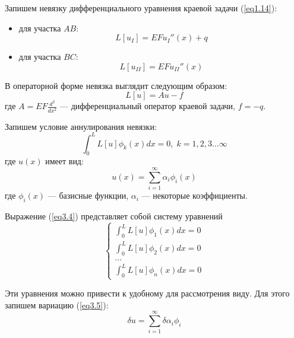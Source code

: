 Запишем невязку дифференциального уравнения краевой задачи (\ref{eq1.14}):
\begin{itemize}
    \item для участка $AB$:
    \begin{equation}
        \label{eq3.1}
        L[u_I] = EFu_I''(x) + q
    \end{equation}
    \item для участка $BC$:
    \begin{equation}
        \label{eq3.2}
        L[u_{II}] = EFu_{II}''(x)
    \end{equation}
\end{itemize}

В операторной форме невязка выглядит следующим образом:
\begin{equation}
    \label{eq3.3}
    L[u] = Au - f
\end{equation}
где $\displaystyle A = EF\frac{d^2}{dx^2}$ --- дифференциальный оператор краевой задачи, $f = -q$.

Запишем условие аннулирования невязки:
\begin{equation}
    \label{eq3.4}
    \int_{0}^{L} L[u] \phi_k(x) dx = 0, \; k=1,2,3 \dots \infty
\end{equation}
где $u(x)$ имеет вид:
\begin{equation}
    \label{eq3.5}
    u(x) = \sum_{i = 1}^{\infty} \alpha_i \phi_i(x)
\end{equation}
где $\phi_i(x)$ --- базисные функции, $\alpha_i$ --- некоторые коэффициенты.

Выражение (\ref{eq3.4}) представляет собой систему уравнений
\begin{equation}
    \label{eq3.6}
    \begin{cases}
        \displaystyle \int_{0}^{L} L[u] \phi_1(x) dx = 0
        \\
        \displaystyle \int_{0}^{L} L[u] \phi_2(x) dx = 0
        \\
        \dots
        \\
        \displaystyle \int_{0}^{L} L[u] \phi_n(x) dx = 0
    \end{cases}
\end{equation}

Эти уравнения можно привести к удобному для рассмотрения виду. Для этого запишем вариацию (\ref{eq3.5}):
\begin{equation}
    \label{eq3.7}
    \delta u = \sum_{i = 1}^{\infty} \delta \alpha_i \phi_i
\end{equation}

